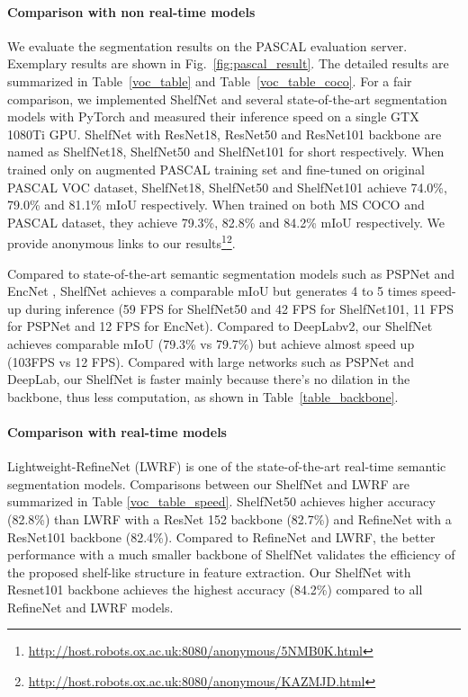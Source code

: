 \documentclass[10pt,twocolumn,letterpaper]{article}
\begin{document}
\paragraph{Comparison with non real-time models}
We evaluate the segmentation results on the PASCAL evaluation server. Exemplary results are shown in Fig.~\ref{fig:pascal_result}. The detailed results are summarized in Table~\ref{voc_table} and Table~\ref{voc_table_coco}. For a fair comparison, we implemented ShelfNet and several state-of-the-art segmentation models with PyTorch and measured their inference speed on a single GTX 1080Ti GPU. ShelfNet with ResNet18, ResNet50 and ResNet101 backbone are named as ShelfNet18, ShelfNet50 and ShelfNet101 for short respectively. When trained only on augmented PASCAL training set and fine-tuned on original PASCAL VOC dataset, ShelfNet18, ShelfNet50 and ShelfNet101 achieve 74.0\%, 79.0\% and 81.1\% mIoU respectively. When trained on both MS COCO and PASCAL dataset,  they achieve 79.3\%, 82.8\% and 84.2\% mIoU respectively. We provide anonymous links to our results\footnote{\url{http://host.robots.ox.ac.uk:8080/anonymous/5NMB0K.html}}\footnote{\url{http://host.robots.ox.ac.uk:8080/anonymous/KAZMJD.html}}.

Compared to state-of-the-art semantic segmentation models such as PSPNet \cite{zhao2017pyramid} and EncNet \cite{zhang2018context}, ShelfNet achieves a comparable mIoU but generates 4 to 5 times speed-up during inference (59 FPS for ShelfNet50 and 42 FPS for ShelfNet101, 11 FPS for PSPNet and 12 FPS for EncNet). Compared to DeepLabv2, our ShelfNet achieves comparable mIoU (79.3\% vs 79.7\%) but achieve almost  speed up (103FPS vs 12 FPS).  Compared with large networks such as PSPNet and DeepLab, our ShelfNet is faster mainly because there's no dilation in the backbone, thus less computation, as shown in Table~\ref{table_backbone}.

\paragraph{Comparison with real-time models}
Lightweight-RefineNet (LWRF) \cite{nekrasov2018light} is one of the state-of-the-art real-time semantic segmentation models. Comparisons between our ShelfNet and LWRF are summarized in Table \ref{voc_table_speed}. ShelfNet50 achieves higher accuracy (82.8\%) than LWRF with a ResNet 152 backbone (82.7\%) and RefineNet with a ResNet101 backbone (82.4\%). Compared to RefineNet and LWRF, the better performance with a much smaller backbone of ShelfNet validates the efficiency of the proposed shelf-like structure in feature extraction. Our ShelfNet with Resnet101 backbone achieves the highest accuracy (84.2\%) compared to all RefineNet and LWRF models. 
\end{document}
